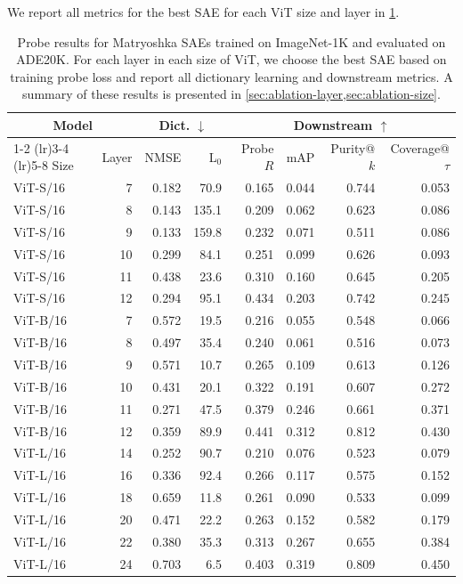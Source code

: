 \documentclass[10pt,twocolumn,letterpaper]{article}
\begin{document}
We report all metrics for the best SAE for each ViT size and layer in \cref{tab:all-ablation-results}.

\begin{table}
    \small
    \centering
    \caption{Probe results for Matryoshka SAEs trained on ImageNet-1K and evaluated on ADE20K. For each layer in each size of ViT, we choose the best SAE based on training probe loss and report all dictionary learning and downstream metrics. A summary of these results is presented in \cref{sec:ablation-layer,sec:ablation-size}.}\label{tab:all-ablation-results}
    \begin{tabular}{lrrrrrrr}
    \toprule
    \multicolumn{2}{c}{Model} & \multicolumn{2}{c}{Dict. $\downarrow$} & \multicolumn{4}{c}{Downstream $\uparrow$} \\
    \cmidrule(lr){1-2} \cmidrule(lr){3-4} \cmidrule(lr){5-8}
    Size & Layer & NMSE & L$_0$ & Probe $R$ & mAP & Purity@$k$ & Coverage@$\tau$ \\
    \midrule
    ViT-S/16 & 7 & 0.182 & 70.9 & 0.165 & 0.044 & 0.744 & 0.053 \\
    ViT-S/16 & 8 & 0.143 & 135.1 & 0.209 & 0.062 & 0.623 & 0.086 \\
    ViT-S/16 & 9 & 0.133 & 159.8 & 0.232 & 0.071 & 0.511 & 0.086 \\
    ViT-S/16 & 10 & 0.299 & 84.1 & 0.251 & 0.099 & 0.626 & 0.093 \\
    ViT-S/16 & 11 & 0.438 & 23.6 & 0.310 & 0.160 & 0.645 & 0.205 \\
    ViT-S/16 & 12 & 0.294 & 95.1 & 0.434 & 0.203 & 0.742 & 0.245 \\
    \midrule
    ViT-B/16 & 7 & 0.572 & 19.5 & 0.216 & 0.055 & 0.548 & 0.066 \\
    ViT-B/16 & 8 & 0.497 & 35.4 & 0.240 & 0.061 & 0.516 & 0.073 \\
    ViT-B/16 & 9 & 0.571 & 10.7 & 0.265 & 0.109 & 0.613 & 0.126 \\
    ViT-B/16 & 10 & 0.431 & 20.1 & 0.322 & 0.191 & 0.607 & 0.272 \\
    ViT-B/16 & 11 & 0.271 & 47.5 & 0.379 & 0.246 & 0.661 & 0.371 \\
    ViT-B/16 & 12 & 0.359 & 89.9 & 0.441 & 0.312 & 0.812 & 0.430 \\
    \midrule
    ViT-L/16 & 14 & 0.252 & 90.7 & 0.210 & 0.076 & 0.523 & 0.079 \\
    ViT-L/16 & 16 & 0.336 & 92.4 & 0.266 & 0.117 & 0.575 & 0.152 \\
    ViT-L/16 & 18 & 0.659 & 11.8 & 0.261 & 0.090 & 0.533 & 0.099 \\
    ViT-L/16 & 20 & 0.471 & 22.2 & 0.263 & 0.152 & 0.582 & 0.179 \\
    ViT-L/16 & 22 & 0.380 & 35.3 & 0.313 & 0.267 & 0.655 & 0.384 \\
    ViT-L/16 & 24 & 0.703 & 6.5 & 0.403 & 0.319 & 0.809 & 0.450 \\
    \bottomrule
    \end{tabular}
\end{table}
\end{document}
